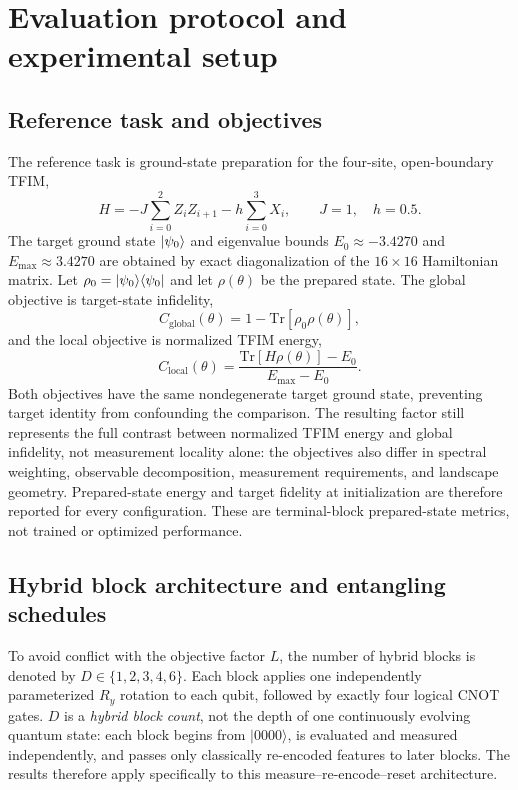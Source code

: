 \documentclass[pdflatex,sn-mathphys-num,Numbered]{sn-jnl}
\begin{document}
\section{Evaluation protocol and experimental setup}\label{sec:methods}
\subsection{Reference task and objectives}

The reference task is ground-state preparation for the four-site, open-boundary TFIM,
\[
H=-J\sum_{i=0}^{2}Z_i Z_{i+1}-h\sum_{i=0}^{3}X_i,
\qquad J=1,\quad h=0.5.
\]
The target ground state $\ket{\psi_0}$ and eigenvalue bounds $E_0\approx-3.4270$ and $E_{\max}\approx3.4270$ are obtained by exact diagonalization of the $16\times16$ Hamiltonian matrix. Let $\rho_0=\ket{\psi_0}\!\bra{\psi_0}$ and let $\rho(\theta)$ be the prepared state. The global objective is target-state infidelity,
\[
C_{\mathrm{global}}(\theta)
=1-\mathrm{Tr}[\rho_0\rho(\theta)],
\]
and the local objective is normalized TFIM energy,
\[
C_{\mathrm{local}}(\theta)
=\frac{\mathrm{Tr}[H\rho(\theta)]-E_0}{E_{\max}-E_0}.
\]
Both objectives have the same nondegenerate target ground state, preventing target identity from confounding the comparison. The resulting factor still represents the full contrast between normalized TFIM energy and global infidelity, not measurement locality alone: the objectives also differ in spectral weighting, observable decomposition, measurement requirements, and landscape geometry. Prepared-state energy and target fidelity at initialization are therefore reported for every configuration. These are terminal-block prepared-state metrics, not trained or optimized performance.

\subsection{Hybrid block architecture and entangling schedules}
\label{sec:ansatz}

To avoid conflict with the objective factor $L$, the number of hybrid blocks is denoted by $D\in\{1,2,3,4,6\}$. Each block applies one independently parameterized $R_y$ rotation to each qubit, followed by exactly four logical CNOT gates. $D$ is a \emph{hybrid block count}, not the depth of one continuously evolving quantum state: each block begins from $\lvert0000\rangle$, is evaluated and measured independently, and passes only classically re-encoded features to later blocks. The results therefore apply specifically to this measure--re-encode--reset architecture.
\end{document}
